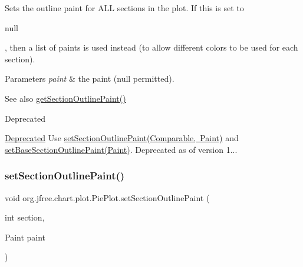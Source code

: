 Sets the outline paint for A\+LL sections in the plot. If this is set to 
\begin{DoxyCode}
null 
\end{DoxyCode}
 , then a list of paints is used instead (to allow different colors to be used for each section).


\begin{DoxyParams}{Parameters}
{\em paint} & the paint ({\ttfamily null} permitted).\\
\hline
\end{DoxyParams}
\begin{DoxySeeAlso}{See also}
\mbox{\hyperlink{classorg_1_1jfree_1_1chart_1_1plot_1_1_pie_plot_a237fbccf0cd23d51f4e62dfcd4a48e1d}{get\+Section\+Outline\+Paint()}}
\end{DoxySeeAlso}
\begin{DoxyRefDesc}{Deprecated}
\item[\mbox{\hyperlink{deprecated__deprecated000071}{Deprecated}}]Use \mbox{\hyperlink{classorg_1_1jfree_1_1chart_1_1plot_1_1_pie_plot_a07d24c6dfd9bde2ec5db77a1bed07506}{set\+Section\+Outline\+Paint(\+Comparable, Paint)}} and \mbox{\hyperlink{classorg_1_1jfree_1_1chart_1_1plot_1_1_pie_plot_ad5603a00bd3987c1735ae3c537453424}{set\+Base\+Section\+Outline\+Paint(\+Paint)}}. Deprecated as of version 1... \end{DoxyRefDesc}
\mbox{\label{classorg_1_1jfree_1_1chart_1_1plot_1_1_pie_plot_acaf457a79b29ff758f90253213d410a6}} 
\subsubsection{\texorpdfstring{set\+Section\+Outline\+Paint()}{setSectionOutlinePaint()}\hspace{0.1cm}{\footnotesize\ttfamily [3/3]}}
{\footnotesize\ttfamily void org.\+jfree.\+chart.\+plot.\+Pie\+Plot.\+set\+Section\+Outline\+Paint (\begin{DoxyParamCaption}\item[{int}]{section,  }\item[{Paint}]{paint }\end{DoxyParamCaption})}


